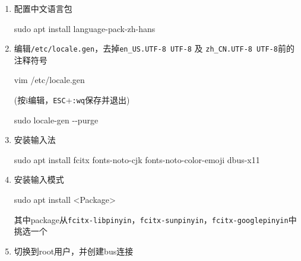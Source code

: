 \documentclass[
]{article}
\newenvironment{Shaded}{}{}
\newcommand{\AttributeTok}[1]{\textcolor[rgb]{0.49,0.56,0.16}{#1}}
\newcommand{\ExtensionTok}[1]{#1}
\newcommand{\FunctionTok}[1]{\textcolor[rgb]{0.02,0.16,0.49}{#1}}
\newcommand{\NormalTok}[1]{#1}
\newcommand{\OperatorTok}[1]{\textcolor[rgb]{0.40,0.40,0.40}{#1}}
\begin{document}
\begin{enumerate}
	\def\labelenumi{\arabic{enumi}.}
	\item
	      配置中文语言包

	      \begin{Shaded}
		      \begin{Highlighting}[]
			      \FunctionTok{sudo}\NormalTok{ apt install language{-}pack{-}zh{-}hans}
		      \end{Highlighting}
	      \end{Shaded}
	\item
	      编辑\texttt{/etc/locale.gen}，去掉\texttt{en\_US.UTF-8\ UTF-8} 及
	      \texttt{zh\_CN.UTF-8\ UTF-8}前的注释符号

	      \begin{Shaded}
		      \begin{Highlighting}[]
			      \ExtensionTok{vim}\NormalTok{ /etc/locale.gen}
		      \end{Highlighting}
	      \end{Shaded}

	      (按i编辑，\texttt{ESC}+\texttt{:wq}保存并退出)

	      \begin{Shaded}
		      \begin{Highlighting}[]
			      \FunctionTok{sudo}\NormalTok{ locale{-}gen }\AttributeTok{{-}{-}purge}
		      \end{Highlighting}
	      \end{Shaded}
	\item
	      安装输入法

	      \begin{Shaded}
		      \begin{Highlighting}[]
			      \FunctionTok{sudo}\NormalTok{ apt install fcitx fonts{-}noto{-}cjk fonts{-}noto{-}color{-}emoji dbus{-}x11}
		      \end{Highlighting}
	      \end{Shaded}
	\item
	      安装输入模式

	      \begin{Shaded}
		      \begin{Highlighting}[]
			      \FunctionTok{sudo}\NormalTok{ apt install }\OperatorTok{\textless{}}\NormalTok{Package}\OperatorTok{\textgreater{}}
		      \end{Highlighting}
	      \end{Shaded}

	      其中package从\texttt{fcitx-libpinyin}，\texttt{fcitx-sunpinyin}，\texttt{fcitx-googlepinyin}中挑选一个
	\item
	      切换到root用户，并创建bus连接


\end{enumerate}
\end{document}
